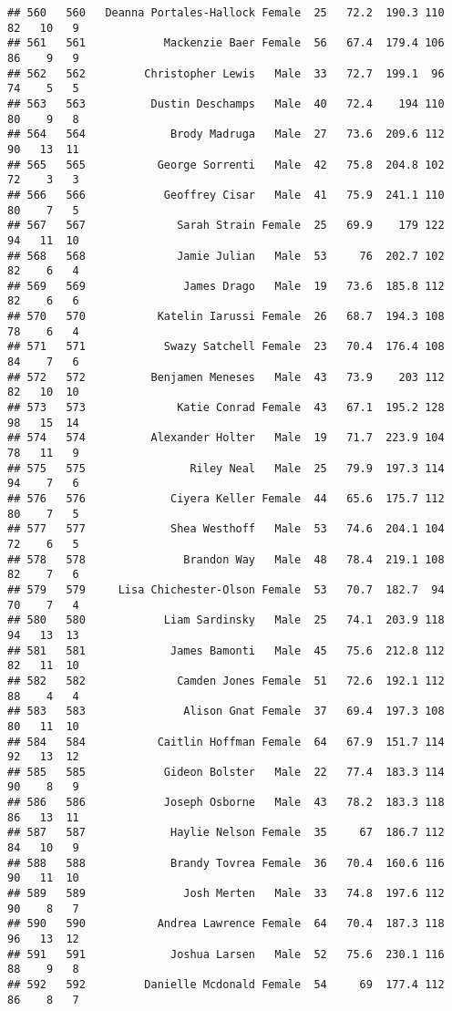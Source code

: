 \documentclass[
]{article}
\begin{document}
\begin{verbatim}
## 560   560   Deanna Portales-Hallock Female  25   72.2  190.3 110  82   10   9
## 561   561            Mackenzie Baer Female  56   67.4  179.4 106  86    9   9
## 562   562         Christopher Lewis   Male  33   72.7  199.1  96  74    5   5
## 563   563          Dustin Deschamps   Male  40   72.4    194 110  80    9   8
## 564   564             Brody Madruga   Male  27   73.6  209.6 112  90   13  11
## 565   565           George Sorrenti   Male  42   75.8  204.8 102  72    3   3
## 566   566            Geoffrey Cisar   Male  41   75.9  241.1 110  80    7   5
## 567   567              Sarah Strain Female  25   69.9    179 122  94   11  10
## 568   568              Jamie Julian   Male  53     76  202.7 102  82    6   4
## 569   569               James Drago   Male  19   73.6  185.8 112  82    6   6
## 570   570           Katelin Iarussi Female  26   68.7  194.3 108  78    6   4
## 571   571            Swazy Satchell Female  23   70.4  176.4 108  84    7   6
## 572   572          Benjamen Meneses   Male  43   73.9    203 112  82   10  10
## 573   573              Katie Conrad Female  43   67.1  195.2 128  98   15  14
## 574   574          Alexander Holter   Male  19   71.7  223.9 104  78   11   9
## 575   575                Riley Neal   Male  25   79.9  197.3 114  94    7   6
## 576   576             Ciyera Keller Female  44   65.6  175.7 112  80    7   5
## 577   577             Shea Westhoff   Male  53   74.6  204.1 104  72    6   5
## 578   578               Brandon Way   Male  48   78.4  219.1 108  82    7   6
## 579   579     Lisa Chichester-Olson Female  53   70.7  182.7  94  70    7   4
## 580   580            Liam Sardinsky   Male  25   74.1  203.9 118  94   13  13
## 581   581             James Bamonti   Male  45   75.6  212.8 112  82   11  10
## 582   582              Camden Jones Female  51   72.6  192.1 112  88    4   4
## 583   583               Alison Gnat Female  37   69.4  197.3 108  80   11  10
## 584   584           Caitlin Hoffman Female  64   67.9  151.7 114  92   13  12
## 585   585            Gideon Bolster   Male  22   77.4  183.3 114  90    8   9
## 586   586            Joseph Osborne   Male  43   78.2  183.3 118  86   13  11
## 587   587             Haylie Nelson Female  35     67  186.7 112  84   10   9
## 588   588             Brandy Tovrea Female  36   70.4  160.6 116  90   11  10
## 589   589               Josh Merten   Male  33   74.8  197.6 112  90    8   7
## 590   590           Andrea Lawrence Female  64   70.4  187.3 118  96   13  12
## 591   591             Joshua Larsen   Male  52   75.6  230.1 116  88    9   8
## 592   592         Danielle Mcdonald Female  54     69  177.4 112  86    8   7

\end{verbatim}
\end{document}
